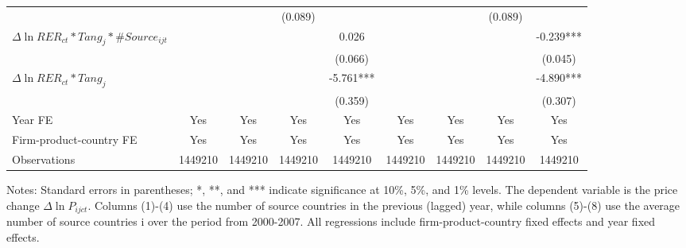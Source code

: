 \documentclass[12pt]{article}
\begin{document}
\begin{table}
{\begin{threeparttable}
\begin{tabular}{lcccccccc}
				&       &       & (0.089) &  &       &       & (0.089) &\\
				$\Delta \ln RER_{ct}*Tang_{j}*\#Source_{ijt}$ &       &       &       & 0.026
				 &       &       &       & -0.239***\\
				&       &       &       & (0.066) &       &       &       & (0.045)\\
				$\Delta \ln RER_{ct}*Tang_{j}$ &       &       &       & -5.761*** &       &       &       & -4.890***\\
				&       &       &       & (0.359) &       &       &       & (0.307)\\
				Year FE  & Yes   & Yes   & Yes   & Yes & Yes   & Yes   & Yes   & Yes\\
				Firm-product-country FE & Yes   & Yes   & Yes   & Yes & Yes   & Yes   & Yes   & Yes\\
				Observations & 1449210 & 1449210 & 1449210 & 1449210 & 1449210 & 1449210 & 1449210 & 1449210\\
				\bottomrule
			\end{tabular}
			\begin{tablenotes}
				\footnotesize
				\item[Notes:] Standard errors in parentheses; *, **, and *** indicate significance at 10\%, 5\%, and 1\% levels. The dependent variable is the price change $\Delta \ln P_{ijct}$. Columns (1)-(4) use the number of source countries in the previous (lagged) year, while columns (5)-(8) use the average number of source countries i over the period from 2000-2007. All regressions include firm-product-country fixed effects and year fixed effects.
			\end{tablenotes}
		\end{threeparttable}
	}
	\label{tab.source.lag}
\end{table}
\end{document}
